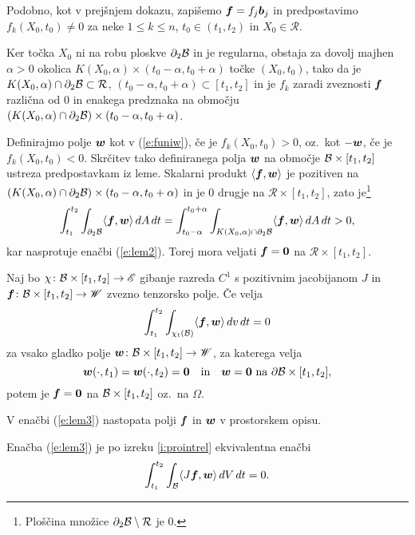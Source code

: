 \proof
	Podobno, kot v prejšnjem dokazu, zapišemo $\boldsymbol f=f_j\boldsymbol b_j$ in predpostavimo
	$f_{k}(X_0,t_0)\neq 0$ za neke $1\leq k\leq n$, $t_0\in (t_1,t_2)$ in $X_0\in \mathcal{R}$.
	
	Ker točka $X_0$ ni na robu ploskve $\partial_2 \mathcal B$ in je regularna,
	obstaja za dovolj majhen $\alpha>0$ okolica $K(X_0,\alpha)\times(t_0-\alpha,t_0+\alpha)$
	točke $(X_0,t_0)$, tako da je $K(X_0,\alpha)\cap\partial_2\mathcal B\subset\mathcal{R}$,
	$(t_0-\alpha,t_0+\alpha)\subset[t_1,t_2]$ in je
	$f_k$ zaradi zveznosti $\boldsymbol f$ različna od 0 in enakega predznaka
	na območju $(K(X_0,\alpha)\cap\partial_2\mathcal B)\times(t_0-\alpha,t_0+\alpha)$.
	
	Definirajmo polje $\boldsymbol w$ kot v
	(\ref{e:funiw}), če je $f_{k}(X_0,t_0) > 0$, oz.~kot $-\boldsymbol w$,
	če je $f_{k}(X_0,t_0) < 0$. Skrčitev tako definiranega polja $\boldsymbol w$ na območje
	$\mathcal B\times[t_1,t_2]$ ustreza predpostavkam iz leme.
	Skalarni produkt $\langle\boldsymbol f,\boldsymbol w\rangle$ je pozitiven na
	$(K(X_0,\alpha)\cap\partial_2\mathcal B)\times(t_0-\alpha,t_0+\alpha)$ in je 0 drugje na $\mathcal{R}\times[t_1,t_2]$,
	zato je\footnote{Ploščina množice $\partial_2\mathcal B\setminus \mathcal{R}$ je 0.}
	\[
		\int_{t_1}^{t_2}\int_{\partial_2\mathcal B} \langle\boldsymbol f,\boldsymbol w\rangle\,dA\,dt=
		\int_{t_0-\alpha}^{t_0+\alpha}\int_{K(X_0,\alpha)\cap\partial_2\mathcal B} \langle\boldsymbol f,\boldsymbol w\rangle\,dA\,dt> 0,
	\]
	kar nasprotuje enačbi (\ref{e:lem2}). Torej mora veljati $\boldsymbol f=\boldsymbol 0$ na
	$\mathcal{R}\times [t_1,t_2]$.
\endproof

\begin{lema} \label{lema3}
	Naj bo $\chi\colon \mathcal B\times[t_1,t_2]\to\mathscr E$ gibanje razreda $C^1$ s pozitivnim jacobijanom $J$ in
	$\boldsymbol f\colon \mathcal B\times[t_1,t_2]\to\mathscr W$ zvezno tenzorsko polje. Če velja
	\begin{equation} \label{e:lem3}
		\int_{t_1}^{t_2}\int_{\chi_t(\mathcal B)}\langle\boldsymbol f,\boldsymbol w\rangle \,dv\,dt=0
	\end{equation}
	za vsako gladko polje $\boldsymbol w\colon \mathcal B\times[t_1,t_2]\to\mathscr W$, za katerega velja
	\[
		\boldsymbol w(\cdot,t_1)=\boldsymbol w(\cdot,t_2)=\boldsymbol 0\quad\textrm{in}
		\quad\boldsymbol w=\boldsymbol 0\ \textrm{na}\ \partial \mathcal B\times[t_1,t_2],
	\]
	potem je $\boldsymbol f=\boldsymbol 0$ na $\mathcal B\times[t_1,t_2]$ oz.~na $\Omega$.
\end{lema}
V enačbi (\ref{e:lem3}) nastopata polji $\boldsymbol f$ in $\boldsymbol w$ v prostorskem opisu.

\proof
	Enačba (\ref{e:lem3}) je po izreku \ref{i:prointrel} ekvivalentna enačbi
	\[ \int_{t_1}^{t_2}\int_{\mathcal B}\langle J\boldsymbol f,\boldsymbol w\rangle \,dV\,dt=0. \]
	
